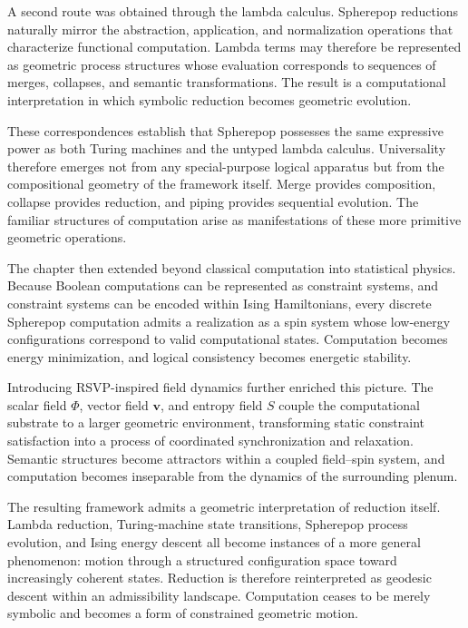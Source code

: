 \documentclass[12pt,letterpaper]{article}
\theoremstyle{remark}
\begin{document}
A second route was obtained through the lambda calculus. Spherepop reductions naturally mirror the abstraction, application, and normalization operations that characterize functional computation. Lambda terms may therefore be represented as geometric process structures whose evaluation corresponds to sequences of merges, collapses, and semantic transformations. The result is a computational interpretation in which symbolic reduction becomes geometric evolution.

These correspondences establish that Spherepop possesses the same expressive power as both Turing machines and the untyped lambda calculus. Universality therefore emerges not from any special-purpose logical apparatus but from the compositional geometry of the framework itself. Merge provides composition, collapse provides reduction, and piping provides sequential evolution. The familiar structures of computation arise as manifestations of these more primitive geometric operations.

The chapter then extended beyond classical computation into statistical physics. Because Boolean computations can be represented as constraint systems, and constraint systems can be encoded within Ising Hamiltonians, every discrete Spherepop computation admits a realization as a spin system whose low-energy configurations correspond to valid computational states. Computation becomes energy minimization, and logical consistency becomes energetic stability.

Introducing RSVP-inspired field dynamics further enriched this picture. The scalar field $\Phi$, vector field $\mathbf{v}$, and entropy field $S$ couple the computational substrate to a larger geometric environment, transforming static constraint satisfaction into a process of coordinated synchronization and relaxation. Semantic structures become attractors within a coupled field--spin system, and computation becomes inseparable from the dynamics of the surrounding plenum.

The resulting framework admits a geometric interpretation of reduction itself. Lambda reduction, Turing-machine state transitions, Spherepop process evolution, and Ising energy descent all become instances of a more general phenomenon: motion through a structured configuration space toward increasingly coherent states. Reduction is therefore reinterpreted as geodesic descent within an admissibility landscape. Computation ceases to be merely symbolic and becomes a form of constrained geometric motion.
\end{document}
